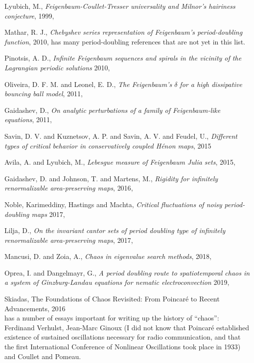 \begin{description}
{Lyubich, M.},
{\em {Feigenbaum-Coullet-Tresser} universality and {Milnor}'s hairiness conjecture},
{1999},

{Mathar, R. J.},
{\em {Chebyshev} series representation of {Feigenbaum's} period-doubling function},
{2010}, has many period-doubling references that are not yet in this list.

{Pinotsis, A. D.},
{\em Infinite {Feigenbaum} sequences and spirals in the vicinity of the
{Lagrangian} periodic solutions}
{2010},

{Oliveira, D. F. M. and Leonel, E. D.},
{\em The {Feigenbaum}'s {$\delta$} for a high dissipative bouncing ball model},
{2011},

{Gaidashev, D.},
{\em On analytic perturbations of a family of {Feigenbaum}-like equations},
 {2011},

{Savin, D. V. and Kuznetsov, A. P. and Savin, A. V. and Feudel, U.},
{\em Different types of critical behavior in conservatively coupled {H{\'{e}}non} maps},
{2015}

{Avila, A. and Lyubich, M.},
{\em Lebesgue measure of Feigenbaum Julia sets},
{2015},

{Gaidashev, D. and Johnson, T. and Martens, M.},
{\em Rigidity for infinitely renormalizable area-preserving maps},
{2016},

Noble, Karimeddiny, Hastings and Machta,
{\em Critical fluctuations of noisy period-doubling maps}
{2017},

{Lilja, D.},
{\em On the invariant cantor sets of period doubling type of infinitely
renormalizable area-preserving maps},
{2017},

{Mancusi, D. and Zoia, A.},
{\em Chaos in eigenvalue search methods},
{2018},

{Oprea, I. and Dangelmayr, G.},
{\em A period doubling route to spatiotemporal chaos in a system of
{Ginzburg-Landau} equations for nematic electroconvection}
{2019},

{Skiadas},
{{The Foundations of Chaos Revisited: From Poincar{\'{e}} to Recent Advancements}},
{2016}
\\
has a number of essays important for writing up the history of ``chaos'':
Ferdinand Verhulst, Jean-Marc Ginoux (I did not know that Poincar\'e
established existence of sustained oscillations necessary for radio
communication, and that the first International Conference of Nonlinear
Oscillations took place in 1933) and
Coullet and Pomeau.


\end{description}
